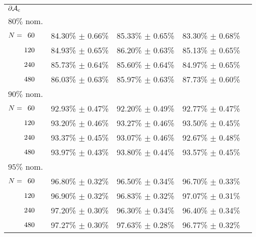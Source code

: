 \begin{onehalfspace}
\begin{table}[htbp]
\begin{tabular}{@{}p{}*{4}{L{\tabcolsep\relax}}@{}}
\midrule
$\mathbf{\operatorname{\partial\mathcal{A}_{c}}}$\\[-0.4em]
$80\%$ nom.\\[-0.4em]
$N = \hphantom{1}60$ & 84.30\% $\pm$ 0.66\% & 85.33\% $\pm$ 0.65\% & 83.30\% $\pm$ 0.68\% & \\[-0.4em]
$\hphantom{N{}={}}120$ & 84.93\% $\pm$ 0.65\% & 86.20\% $\pm$ 0.63\% & 85.13\% $\pm$ 0.65\% & \\[-0.4em]
$\hphantom{N{}={}}240$ & 85.73\% $\pm$ 0.64\% & 85.60\% $\pm$ 0.64\% & 84.97\% $\pm$ 0.65\% & \\[-0.4em]
$\hphantom{N{}={}}480$ & 86.03\% $\pm$ 0.63\% & 85.97\% $\pm$ 0.63\% & 87.73\% $\pm$ 0.60\%\\ 
$90\%$ nom.  \\[-0.4em]
$N = \hphantom{1}60$ & 92.93\% $\pm$ 0.47\% & 92.20\% $\pm$ 0.49\% & 92.77\% $\pm$ 0.47\% & \\[-0.4em]
$\hphantom{N{}={}}120$ & 93.20\% $\pm$ 0.46\% & 93.27\% $\pm$ 0.46\% & 93.50\% $\pm$ 0.45\% & \\[-0.4em]
$\hphantom{N{}={}}240$ & 93.37\% $\pm$ 0.45\% & 93.07\% $\pm$ 0.46\% & 92.67\% $\pm$ 0.48\% & \\[-0.4em]
$\hphantom{N{}={}}480$ & 93.97\% $\pm$ 0.43\% & 93.80\% $\pm$ 0.44\% & 93.57\% $\pm$ 0.45\%\\ 
$95\%$ nom.  \\[-0.4em]
$N = \hphantom{1}60$ & 96.80\% $\pm$ 0.32\% & 96.50\% $\pm$ 0.34\% & 96.70\% $\pm$ 0.33\% & \\[-0.4em]
$\hphantom{N{}={}}120$ & 96.90\% $\pm$ 0.32\% & 96.83\% $\pm$ 0.32\% & 97.07\% $\pm$ 0.31\% & \\[-0.4em]
$\hphantom{N{}={}}240$ & 97.20\% $\pm$ 0.30\% & 96.30\% $\pm$ 0.34\% & 96.40\% $\pm$ 0.34\% & \\[-0.4em]
$\hphantom{N{}={}}480$ & 97.27\% $\pm$ 0.30\% & 97.63\% $\pm$ 0.28\% & 96.77\% $\pm$ 0.32\%\\
\bottomrule
\end{tabular}
\end{table}
\end{onehalfspace}